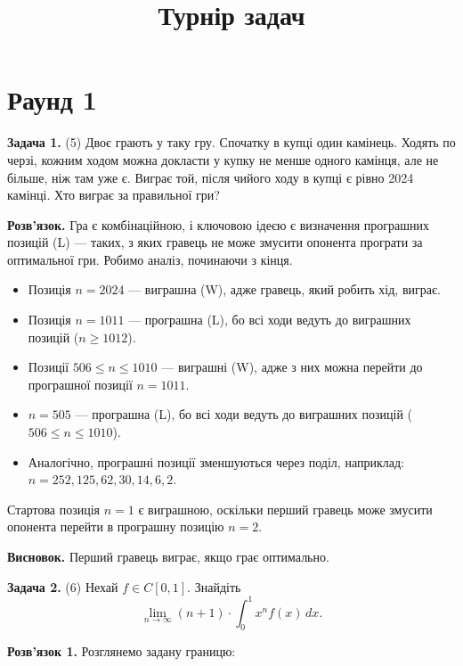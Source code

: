 \documentclass{article}
\begin{document}
\title{\textbf{Турнір задач}}
\author{}
\date{}

\maketitle

\section*{\centering \textbf{Раунд 1}}

\textbf{Задача 1.} (5) Двоє грають у таку гру. Спочатку в купці один камінець. Ходять по черзі, кожним ходом можна докласти у купку не менше одного камінця, але не більше, ніж там уже є. Виграє той, після чийого ходу в купці є рівно 2024 камінці. Хто виграє за правильної гри?

\textbf{Розв’язок.} Гра є комбінаційною, і ключовою ідеєю є визначення програшних позицій (L) — таких, з яких гравець не може змусити опонента програти за оптимальної гри. Робимо аналіз, починаючи з кінця.

\begin{itemize}
    \item Позиція \( n = 2024 \) — виграшна (W), адже гравець, який робить хід, виграє.
    \item Позиція \( n = 1011 \) — програшна (L), бо всі ходи ведуть до виграшних позицій (\( n \geq 1012 \)).
    \item Позиції \( 506 \leq n \leq 1010 \) — виграшні (W), адже з них можна перейти до програшної позиції \( n = 1011 \).
    \item \( n = 505 \) — програшна (L), бо всі ходи ведуть до виграшних позицій (\( 506 \leq n \leq 1010 \)).
    \item Аналогічно, програшні позиції зменшуються через поділ, наприклад: \( n = 252, 125, 62, 30, 14, 6, 2 \).
\end{itemize}

Стартова позиція \( n = 1 \) є виграшною, оскільки перший гравець може змусити опонента перейти в програшну позицію \( n = 2 \).

\textbf{Висновок.} Перший гравець виграє, якщо грає оптимально.

\bigskip

\noindent\textbf{Задача 2.} (6) Нехай \( f \in C[0, 1] \). Знайдіть  
\[
\lim_{n \to \infty} (n + 1) \cdot \int_{0}^{1} x^n f(x) \, dx.
\]

\textbf{Розв’язок 1.} Розглянемо задану границю:
\end{document}
